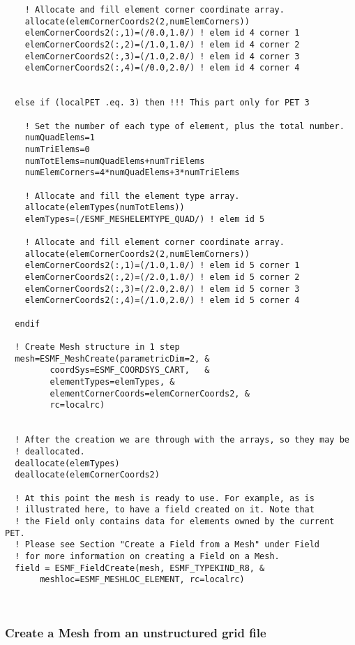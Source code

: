 \begin{verbatim}
    ! Allocate and fill element corner coordinate array.
    allocate(elemCornerCoords2(2,numElemCorners))
    elemCornerCoords2(:,1)=(/0.0,1.0/) ! elem id 4 corner 1 
    elemCornerCoords2(:,2)=(/1.0,1.0/) ! elem id 4 corner 2
    elemCornerCoords2(:,3)=(/1.0,2.0/) ! elem id 4 corner 3
    elemCornerCoords2(:,4)=(/0.0,2.0/) ! elem id 4 corner 4


  else if (localPET .eq. 3) then !!! This part only for PET 3

    ! Set the number of each type of element, plus the total number.
    numQuadElems=1
    numTriElems=0
    numTotElems=numQuadElems+numTriElems
    numElemCorners=4*numQuadElems+3*numTriElems

    ! Allocate and fill the element type array.
    allocate(elemTypes(numTotElems))
    elemTypes=(/ESMF_MESHELEMTYPE_QUAD/) ! elem id 5

    ! Allocate and fill element corner coordinate array.
    allocate(elemCornerCoords2(2,numElemCorners))
    elemCornerCoords2(:,1)=(/1.0,1.0/) ! elem id 5 corner 1 
    elemCornerCoords2(:,2)=(/2.0,1.0/) ! elem id 5 corner 2
    elemCornerCoords2(:,3)=(/2.0,2.0/) ! elem id 5 corner 3
    elemCornerCoords2(:,4)=(/1.0,2.0/) ! elem id 5 corner 4

  endif
  
  ! Create Mesh structure in 1 step
  mesh=ESMF_MeshCreate(parametricDim=2, &
         coordSys=ESMF_COORDSYS_CART,   &
         elementTypes=elemTypes, &
         elementCornerCoords=elemCornerCoords2, &
         rc=localrc)


  ! After the creation we are through with the arrays, so they may be
  ! deallocated.
  deallocate(elemTypes)
  deallocate(elemCornerCoords2)

  ! At this point the mesh is ready to use. For example, as is 
  ! illustrated here, to have a field created on it. Note that 
  ! the Field only contains data for elements owned by the current PET.
  ! Please see Section "Create a Field from a Mesh" under Field
  ! for more information on creating a Field on a Mesh. 
  field = ESMF_FieldCreate(mesh, ESMF_TYPEKIND_R8, &
       meshloc=ESMF_MESHLOC_ELEMENT, rc=localrc)

 
\end{verbatim}
 

  \subsubsection{Create a Mesh from an unstructured grid file}
  \label{sec:example:UnstructFromFile}
  

